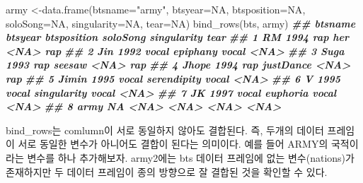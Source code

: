 \documentclass[
]{book}
\newenvironment{Shaded}{\begin{snugshade}}{\end{snugshade}}
\newcommand{\AttributeTok}[1]{\textcolor[rgb]{0.77,0.63,0.00}{#1}}
\newcommand{\ConstantTok}[1]{\textcolor[rgb]{0.00,0.00,0.00}{#1}}
\newcommand{\DocumentationTok}[1]{\textcolor[rgb]{0.56,0.35,0.01}{\textbf{\textit{#1}}}}
\newcommand{\FunctionTok}[1]{\textcolor[rgb]{0.00,0.00,0.00}{#1}}
\newcommand{\NormalTok}[1]{#1}
\newcommand{\OtherTok}[1]{\textcolor[rgb]{0.56,0.35,0.01}{#1}}
\newcommand{\StringTok}[1]{\textcolor[rgb]{0.31,0.60,0.02}{#1}}
\theoremstyle{definition}
\theoremstyle{definition}
\theoremstyle{definition}
\theoremstyle{definition}
\theoremstyle{remark}
\begin{document}
\begin{Shaded}
\begin{Highlighting}[]
\NormalTok{army }\OtherTok{\textless{}{-}}\FunctionTok{data.frame}\NormalTok{(}\AttributeTok{btsname=}\StringTok{"army"}\NormalTok{, }\AttributeTok{btsyear=}\ConstantTok{NA}\NormalTok{, }\AttributeTok{btsposition=}\ConstantTok{NA}\NormalTok{, }\AttributeTok{soloSong=}\ConstantTok{NA}\NormalTok{, }\AttributeTok{singularity=}\ConstantTok{NA}\NormalTok{, }\AttributeTok{tear=}\ConstantTok{NA}\NormalTok{)}
\FunctionTok{bind\_rows}\NormalTok{(bts, army)}
\DocumentationTok{\#\#   btsname btsyear btsposition    soloSong singularity tear}
\DocumentationTok{\#\# 1      RM    1994         rap         her        \textless{}NA\textgreater{}  rap}
\DocumentationTok{\#\# 2     Jin    1992       vocal    epiphany       vocal \textless{}NA\textgreater{}}
\DocumentationTok{\#\# 3    Suga    1993         rap      seesaw        \textless{}NA\textgreater{}  rap}
\DocumentationTok{\#\# 4   Jhope    1994         rap   justDance        \textless{}NA\textgreater{}  rap}
\DocumentationTok{\#\# 5   Jimin    1995       vocal serendipity       vocal \textless{}NA\textgreater{}}
\DocumentationTok{\#\# 6       V    1995       vocal singularity       vocal \textless{}NA\textgreater{}}
\DocumentationTok{\#\# 7      JK    1997       vocal    euphoria       vocal \textless{}NA\textgreater{}}
\DocumentationTok{\#\# 8    army      NA        \textless{}NA\textgreater{}        \textless{}NA\textgreater{}        \textless{}NA\textgreater{} \textless{}NA\textgreater{}}
\end{Highlighting}
\end{Shaded}

bind\_rows는 comlumn이 서로 동일하지 않아도 결합된다. 즉, 두개의 데이터 프레임이 서로 동일한 변수가 아니어도 결합이 된다는 의미이다. 예를 들어 ARMY의 국적이라는 변수를 하나 추가해보자. army2에는 bts 데이터 프레임에 없는 변수(nations)가 존재하지만 두 데이터 프레임이 종의 방향으로 잘 결합된 것을 확인할 수 있다.
\end{document}
